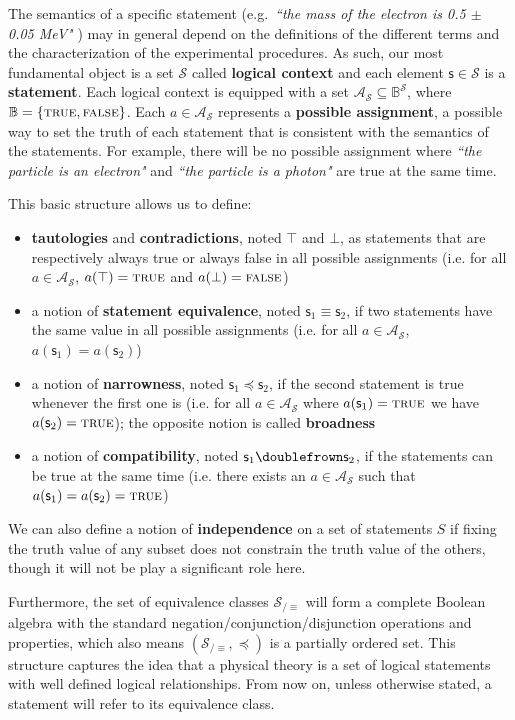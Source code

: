 \documentclass[submission,copyright,creativecommons]{eptcs}
\def\Bool{\mathbb{B}}
\def\TRUE{\textsc{true}}
\def\FALSE{\textsc{false}}
\def\logCtx{\mathcal{S}}
\newcommand{\pAss}[1][\mathcal{S}] {\mathcal{A}_{#1}}
\def\tautology{\top} %
\def\contradiction{\bot} %
\newcommand{\stmt}[1][s] {\mathsf{#1}} %
\def\comp{\doublefrown} %
\def\narrower{\preccurlyeq} %
\newcommand{\statement}[1] {\emph{``#1"}}
\begin{document}
The semantics of a specific statement (e.g.~\statement{the mass of the electron is 0.5 $\pm$ 0.05 MeV} ) may in general depend on the definitions of the different terms and the characterization of the experimental procedures. As such, our most fundamental object is a set $\logCtx$ called \textbf{logical context} and each element $\stmt \in \logCtx$ is a \textbf{statement}. Each logical context is equipped with a set $\pAss \subseteq \Bool^\logCtx$, where $\Bool = \{ \TRUE, \FALSE \}$. Each $a \in \pAss$ represents a \textbf{possible assignment}, a possible way to set the truth of each statement that is consistent with the semantics of the statements. For example, there will be no possible assignment where \statement{the particle is an electron} and \statement{the particle is a photon} are true at the same time.

This basic structure allows us to define:
\begin{itemize}
	\item \textbf{tautologies} and \textbf{contradictions}, noted $\tautology$ and $\contradiction$, as statements that are respectively always true or always false in all possible assignments (i.e. for all $a \in \pAss$, $a(\tautology) = \TRUE$ and $a(\contradiction) = \FALSE$)
	\item a notion of \textbf{statement equivalence}, noted $\stmt_1 \equiv \stmt_2$, if two statements have the same value in all possible assignments (i.e. for all $a \in \pAss$, $a(\stmt_1) = a(\stmt_2)$)
	\item a notion of \textbf{narrowness}, noted $\stmt_1 \narrower \stmt_2$, if the second statement is true whenever the first one is (i.e. for all $a \in \pAss$ where $a(\stmt_1) = \TRUE$ we have $a(\stmt_2) = \TRUE$); the opposite notion is called \textbf{broadness} 
	\item a notion of \textbf{compatibility}, noted $\stmt_1 \comp \stmt_2$, if the statements can be true at the same time (i.e. there exists an $a \in \pAss$ such that $a(\stmt_1) = a(\stmt_2) = \TRUE$)
\end{itemize}
We can also define a notion of \textbf{independence} on a set of statements $S$ if fixing the truth value of any subset does not constrain the truth value of the others, though it will not be play a significant role here.

Furthermore, the set of equivalence classes $\logCtx_{/\equiv}$ will form a complete Boolean algebra with the standard negation/conjunction/disjunction operations and properties, which also means $(\logCtx_{/\equiv}, \narrower)$ is a partially ordered set. This structure captures the idea that a physical theory is a set of logical statements with well defined logical relationships. From now on, unless otherwise stated, a statement will refer to its equivalence class.
\end{document}
